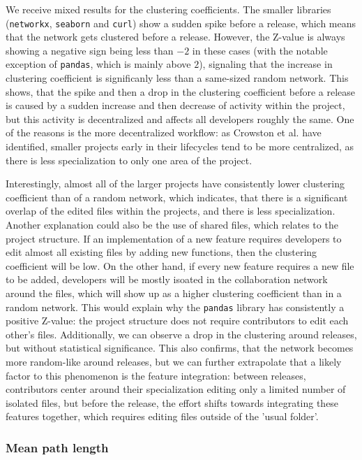 We receive mixed results for the clustering coefficients. The smaller libraries (\texttt{networkx}, \texttt{seaborn} and \texttt{curl}) show a sudden spike before a release, which means that the network gets clustered before a release. However, the Z-value is always showing a negative sign being less than $-2$ in these cases (with the notable exception of \texttt{pandas}, which is mainly above $2$), signaling that the increase in clustering coefficient is significanly less than a same-sized random network. This shows, that the spike and then a drop in the clustering coefficient before a release is caused by a sudden increase and then decrease of activity within the project, but this activity is decentralized and affects all developers roughly the same. One of the reasons is the more decentralized workflow: as Crowston et al. \cite{crowstonHierarchyCentralizationFree2006} have identified, smaller projects early in their lifecycles tend to be more centralized, as there is less specialization to only one area of the project.

Interestingly, almost all of the larger projects have consistently lower clustering coefficient than of a random network, which indicates, that there is a significant overlap of the edited files within the projects, and there is less specialization. Another explanation could also be the use of shared files, which relates to the project structure. If an implementation of a new feature requires developers to edit almost all existing files by adding new functions, then the clustering coefficient will be low. On the other hand, if every new feature requires a new file to be added, developers will be mostly isoated in the collaboration network around the files, which will show up as a higher clustering coefficient than in a random network. This would explain why the \texttt{pandas} library has consistently a positive Z-value: the project structure does not require contributors to edit each other's files. Additionally, we can observe a drop in the clustering around releases, but without statistical significance. This also confirms, that the network becomes more random-like around releases, but we can further extrapolate that a likely factor to this phenomenon is the feature integration: between releases, contributors center around their specialization editing only a limited number of isolated files, but before the release, the effort shifts towards integrating these features together, which requires editing files outside of the 'usual folder'.

\subsubsection{Mean path length}

